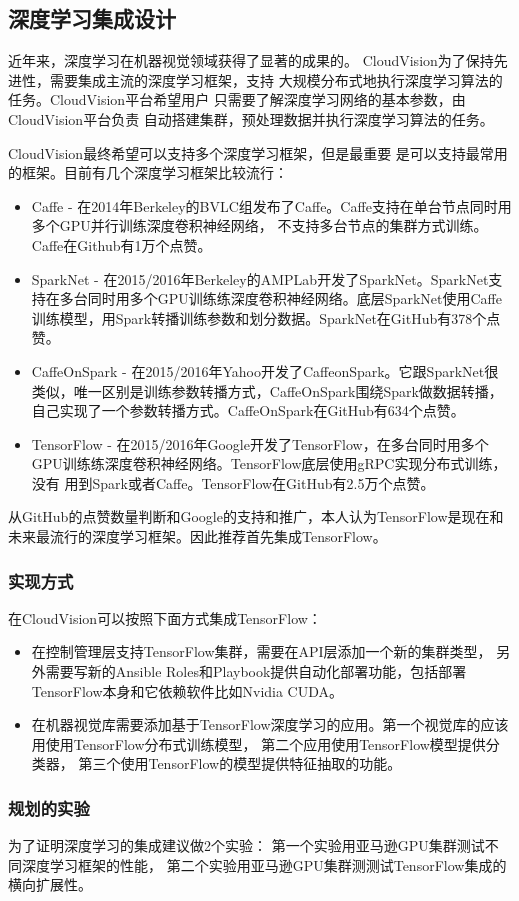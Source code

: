 \subsection{深度学习集成设计}
\label{subsec:deep-learning-int}
近年来，深度学习在机器视觉领域获得了显著的成果的。
CloudVision为了保持先进性，需要集成主流的深度学习框架，支持
大规模分布式地执行深度学习算法的任务。CloudVision平台希望用户
只需要了解深度学习网络的基本参数，由CloudVision平台负责
自动搭建集群，预处理数据并执行深度学习算法的任务。

CloudVision最终希望可以支持多个深度学习框架，但是最重要
是可以支持最常用的框架。目前有几个深度学习框架比较流行：
\begin{itemize}
  \item Caffe - 在2014年Berkeley的BVLC组发布了Caffe。Caffe支持在单台节点同时用多个GPU并行训练深度卷积神经网络，
        不支持多台节点的集群方式训练。Caffe在Github有1万个点赞。
  \item SparkNet - 在2015/2016年Berkeley的AMPLab开发了SparkNet。SparkNet支持在多台同时用多个GPU训练练深度卷积神经网络。底层SparkNet使用Caffe
        训练模型，用Spark转播训练参数和划分数据。SparkNet在GitHub有378个点赞。
  \item CaffeOnSpark - 在2015/2016年Yahoo开发了CaffeonSpark。它跟SparkNet很类似，唯一区别是训练参数转播方式，CaffeOnSpark围绕Spark做数据转播，
        自己实现了一个参数转播方式。CaffeOnSpark在GitHub有634个点赞。
  \item TensorFlow - 在2015/2016年Google开发了TensorFlow，在多台同时用多个GPU训练练深度卷积神经网络。TensorFlow底层使用gRPC实现分布式训练，没有
        用到Spark或者Caffe。TensorFlow在GitHub有2.5万个点赞。
\end{itemize}
从GitHub的点赞数量判断和Google的支持和推广，本人认为TensorFlow是现在和未来最流行的深度学习框架。因此推荐首先集成TensorFlow。

\subsubsection{实现方式}
在CloudVision可以按照下面方式集成TensorFlow：
\begin{itemize}
  \item 在控制管理层支持TensorFlow集群，需要在API层添加一个新的集群类型，
        另外需要写新的Ansible Roles和Playbook提供自动化部署功能，包括部署TensorFlow本身和它依赖软件比如Nvidia CUDA。
  \item 在机器视觉库需要添加基于TensorFlow深度学习的应用。第一个视觉库的应该用使用TensorFlow分布式训练模型，
        第二个应用使用TensorFlow模型提供分类器，
        第三个使用TensorFlow的模型提供特征抽取的功能。
\end{itemize}


\subsubsection{规划的实验}
为了证明深度学习的集成建议做2个实验：
第一个实验用亚马逊GPU集群测试不同深度学习框架的性能，
第二个实验用亚马逊GPU集群测测试TensorFlow集成的横向扩展性。






